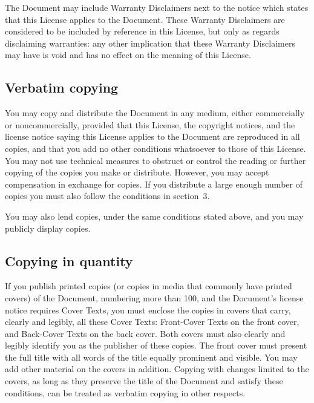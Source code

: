 \documentclass[letterpaper,twoside]{scrartcl}
\begin{document}
   The Document may include Warranty Disclaimers next to the notice which
   states that this License applies to the Document.  These Warranty
   Disclaimers are considered to be included by reference in this
   License, but only as regards disclaiming warranties: any other
   implication that these Warranty Disclaimers may have is void and has
   no effect on the meaning of this License.


   
   
   \subsection{Verbatim copying}
   

   You may copy and distribute the Document in any medium, either
   commercially or noncommercially, provided that this License, the
   copyright notices, and the license notice saying this License applies
   to the Document are reproduced in all copies, and that you add no other
   conditions whatsoever to those of this License.  You may not use
   technical measures to obstruct or control the reading or further
   copying of the copies you make or distribute.  However, you may accept
   compensation in exchange for copies.  If you distribute a large enough
   number of copies you must also follow the conditions in section~3.

   You may also lend copies, under the same conditions stated above, and
   you may publicly display copies.


   
   
   \subsection{Copying in quantity}
   


   If you publish printed copies (or copies in media that commonly have
   printed covers) of the Document, numbering more than 100, and the
   Document's license notice requires Cover Texts, you must enclose the
   copies in covers that carry, clearly and legibly, all these Cover
   Texts: Front-Cover Texts on the front cover, and Back-Cover Texts on
   the back cover.  Both covers must also clearly and legibly identify
   you as the publisher of these copies.  The front cover must present
   the full title with all words of the title equally prominent and
   visible.  You may add other material on the covers in addition.
   Copying with changes limited to the covers, as long as they preserve
   the title of the Document and satisfy these conditions, can be treated
   as verbatim copying in other respects.
\end{document}

